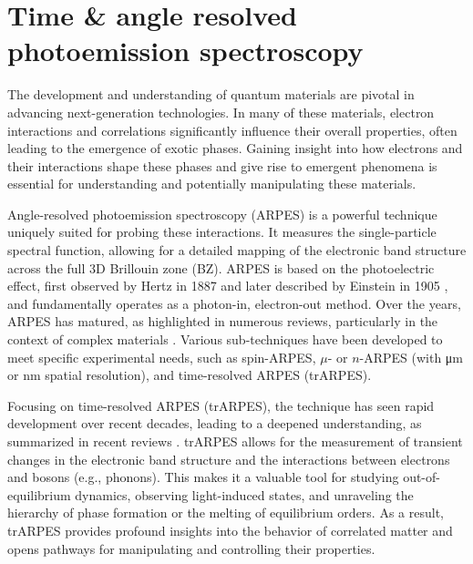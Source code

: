 \renewcommand{\chaptercolor}{custom_brown}
\chapter{Time \& angle resolved photoemission spectroscopy}

The development and understanding of quantum materials are pivotal in advancing next-generation technologies.
In many of these materials, electron interactions and correlations significantly influence their overall properties, often leading to the emergence of exotic phases.
Gaining insight into how electrons and their interactions shape these phases and give rise to emergent phenomena is essential for understanding and potentially manipulating these materials.

Angle-resolved photoemission spectroscopy (ARPES) is a powerful technique uniquely suited for probing these interactions.
It measures the single-particle spectral function, allowing for a detailed mapping of the electronic band structure across the full 3D Brillouin zone (BZ).
ARPES is based on the photoelectric effect, first observed by Hertz in 1887 \cite{hertz_ueber_1887} and later described by Einstein in 1905 \cite{einstein_uber_1905}, and fundamentally operates as a photon-in, electron-out method.
Over the years, ARPES has matured, as highlighted in numerous reviews, particularly in the context of complex materials \cite{damascelli_angle-resolved_2003,damascelli_angle-resolved_2003,lu_angle-resolved_2012,gedik_photoemission_2017,lv_angle-resolved_2019,zhang_angle-resolved_2022}.
Various sub-techniques have been developed to meet specific experimental needs, such as spin-ARPES, $\mu$- or $n$-ARPES (with \unit{\micro\meter} or \unit{\nano\meter} spatial resolution), and time-resolved ARPES (trARPES).

Focusing on time-resolved ARPES (trARPES), the technique has seen rapid development over recent decades, leading to a deepened understanding, as summarized in recent reviews \cite{smallwood_ultrafast_2016,huang_high-resolution_2022,boschini_time-resolved_2024}.
trARPES allows for the measurement of transient changes in the electronic band structure and the interactions between electrons and bosons (e.g., phonons).
This makes it a valuable tool for studying out-of-equilibrium dynamics, observing light-induced states, and unraveling the hierarchy of phase formation or the melting of equilibrium orders.
As a result, trARPES provides profound insights into the behavior of correlated matter and opens pathways for manipulating and controlling their properties.


